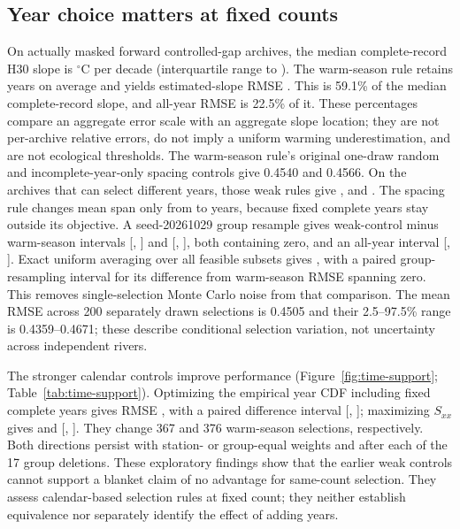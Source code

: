 \documentclass[draft,linenumbers]{agujournal2025}
\begin{document}



\subsection{Year choice matters at fixed counts}
On \PTRTimeN{} actually masked forward controlled-gap archives, the median complete-record H30 slope is \PTRTimeMedianSlope{}$^{\circ}$C per decade (interquartile range \PTRTimeSlopeLower{} to \PTRTimeSlopeUpper{}). The warm-season rule retains \PRTimeWarmYears{} years on average and yields estimated-slope RMSE \PTRTimeWarmRMSE{}. This is 59.1\% of the median complete-record slope, and all-year RMSE \PTRTimeAllRMSE{} is 22.5\% of it. These percentages compare an aggregate error scale with an aggregate slope location; they are not per-archive relative errors, do not imply a uniform warming underestimation, and are not ecological thresholds. The warm-season rule's original one-draw random and incomplete-year-only spacing controls give 0.4540 and 0.4566. On the \PTRTimeChoiceN{} archives that can select different years, those weak rules give \PTRTimeWarmChoiceRMSE{}, \PTRTimeRandomChoiceRMSE{} and \PTRTimeBalancedChoiceRMSE{}. The spacing rule changes mean span only from \PTRTimeWarmSpan{} to \PTRTimeBalancedSpan{} years, because fixed complete years stay outside its objective. A seed-20261029 group resample gives weak-control minus warm-season intervals [\PTRTimeRandomLow, \PTRTimeRandomHigh] and [\PTRTimeBalancedLow, \PTRTimeBalancedHigh], both containing zero, and an all-year interval [\PTRTimeAllLow, \PTRTimeAllHigh]. Exact uniform averaging over all feasible subsets gives \PETimeUniformRMSE{}, with a paired group-resampling interval for its difference from warm-season RMSE spanning zero. This removes single-selection Monte Carlo noise from that comparison. The mean RMSE across 200 separately drawn selections is 0.4505 and their 2.5--97.5\% range is 0.4359--0.4671; these describe conditional selection variation, not uncertainty across independent rivers.

The stronger calendar controls improve performance (Figure~\ref{fig:time-support}; Table~\ref{tab:time-support}). Optimizing the empirical year CDF including fixed complete years gives RMSE \PETimeCDFRMSE{}, with a paired difference interval [\PETimeCDFLow, \PETimeCDFHigh]; maximizing $S_{xx}$ gives \PETimeSxxRMSE{} and [\PETimeSxxLow, \PETimeSxxHigh]. They change 367 and 376 warm-season selections, respectively. Both directions persist with station- or group-equal weights and after each of the 17 group deletions. These exploratory findings show that the earlier weak controls cannot support a blanket claim of no advantage for same-count selection. They assess calendar-based selection rules at fixed count; they neither establish equivalence nor separately identify the effect of adding years.
\end{document}
